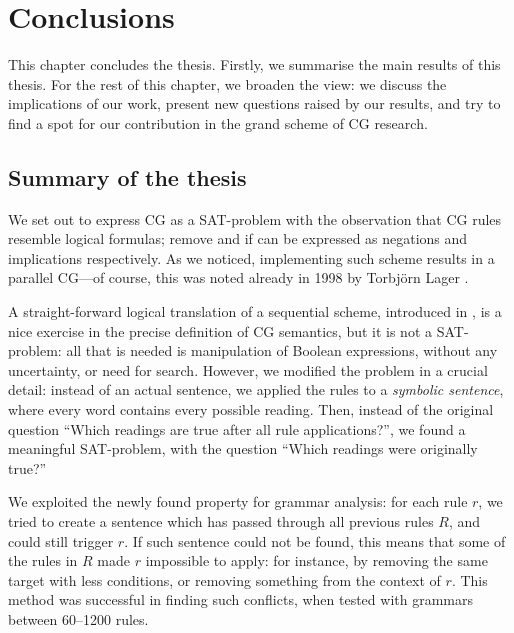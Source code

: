 \chapter{Conclusions}
\label{chapterConclusions}


This chapter concludes the thesis.
Firstly, we summarise the main results of this thesis.
For the rest of this chapter, we broaden the view: we discuss the implications of our work, 
present new questions raised by our results, and try to find a spot for our contribution 
in the grand scheme of CG research.

\section{Summary of the thesis}

We set out to express CG as a SAT-problem with the observation that CG rules resemble logical formulas; {\sc remove} and {\sc if} can be expressed as negations and implications respectively. As we noticed, implementing such scheme results in a parallel CG---of course, this was noted already in 1998 by Torbjörn Lager \cite{lager98}.

A straight-forward logical translation of a sequential scheme, introduced in \cite{lager_nivre01}, is a nice exercise in the precise definition of CG semantics, 
but it is not a SAT-problem: all that is needed is manipulation of Boolean expressions, 
without any uncertainty, or need for search. 
However, we modified the problem in a crucial detail: instead of an actual sentence, 
we applied the rules to a {\em symbolic sentence}, where every word contains every possible reading.
Then, instead of the original question ``Which readings are true after all rule applications?'', 
we found a meaningful SAT-problem, with the question ``Which readings were originally true?''

We exploited the newly found property for grammar analysis: 
for each rule $r$, we tried to create a sentence 
which has passed through all previous rules $R$, and could still trigger $r$.
If such sentence could not be found, this means that some of the rules in $R$ made $r$ impossible to apply: for instance, by removing the same target with less conditions, or removing something from the context of $r$.
This method was successful in finding such conflicts, when tested with grammars between 60--1200 rules.



